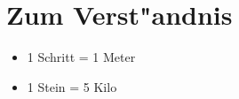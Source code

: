 \section{Zum Verst"andnis}
\begin{itemize}
\item 1 Schritt = 1 Meter
\item 1 Stein = 5 Kilo
\end{itemize}
